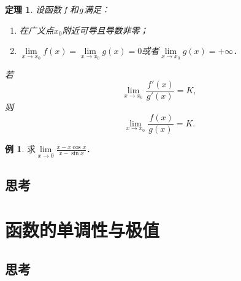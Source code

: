 \documentclass[a4paper,punct=CCT]{ctexbook}
\renewcommand*{\enumparen}[1]{（\makebox[0.6em][c]{\normalfont#1}）}
\newtheorem*{theorem*}{定理}
\theoremstyle{definition}
\newtheorem*{example*}{例}
\theoremstyle{remark}
\newif\ifshowex
\begin{document}
\begin{theorem*}
  \label{thm:lhospital}
  设函数\(\,f\mkern2mu\)和\(\mkern1mu g\)满足：
  \begin{enumerate}
    \renewcommand{\labelenumi}{\enumparen{\arabic{enumi}}}
  \item 在广义点\(x_0\)附近可导且导数非零；
  \item \(\!\lim\limits_{x\to x_0\!} f(x) = \!\lim\limits_{x\to x_0\!} g(x) = 0\)或者\(\!\lim\limits_{x\to x_0\!} g(x) = +\infty\)．
  \end{enumerate}
  若
  \begin{equation*}
    \lim_{x\to x_0} \frac{\,f'(x)}{g'(x)} = K,
  \end{equation*}
  则
  \begin{equation*}
    \lim_{x\to x_0} \frac{\,f(x)}{g(x)}
    = K.
  \end{equation*}
\end{theorem*}

\begin{example*}
  求\(\lim\limits_{x\to0} \frac{x-x\cos x}{x - \sin x}\)．
\end{example*}

\subsection*{思考}

\ifshowex
\currentpdfbookmark{练习}{B1.5.2.E}
\subsection*{练习}
\fi

\section{函数的单调性与极值}

\subsection*{思考}

\ifshowex
\currentpdfbookmark{练习}{B1.5.3.E}
\subsection*{练习}
\fi
\end{document}
